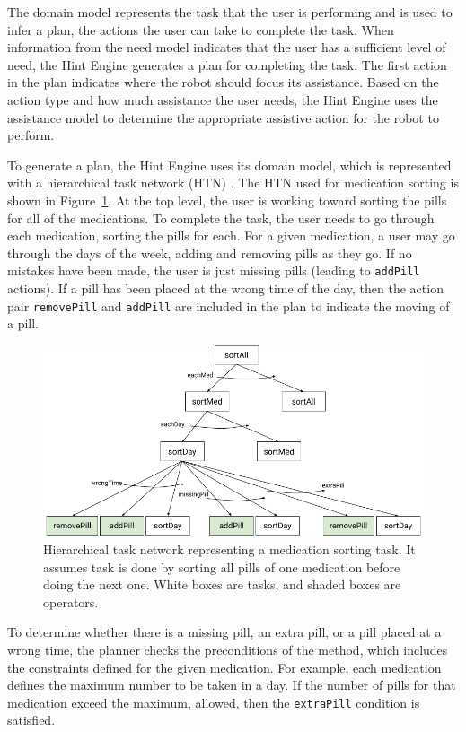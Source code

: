 \documentclass[letterpaper]{article} %
\begin{document}
The domain model represents the task that the user is performing and is used to infer a plan, the actions the user can take to complete the task.  When information from the need model indicates that the user has a sufficient level of need, the Hint Engine generates a plan for completing the task.  The first action in the plan indicates where the robot should focus its assistance.  Based on the action type and how much assistance the user needs, the Hint Engine uses the assistance model to determine the appropriate assistive action for the robot to perform.

To generate a plan, the Hint Engine uses its domain model, which is represented with a hierarchical task network (HTN) \cite{nau1999shop}.  The HTN used for medication sorting is shown in Figure~\ref{fig:htn}.  At the top level, the user is working toward sorting the pills for all of the medications.  To complete the task, the user needs to go through each medication, sorting the pills for each. For a given medication, a user may go through the days of the week, adding and removing pills as they go.  If no mistakes have been made, the user is just missing pills (leading to \texttt{addPill} actions).  If a pill has been placed at the wrong time of the day, then the action pair \texttt{removePill} and \texttt{addPill} are included in the plan to indicate the moving of a pill.

\begin{figure}[h]
\centering
\includegraphics[width=0.99\columnwidth]{medsorting_htn.png}
\caption{Hierarchical task network representing a medication sorting task. It assumes task is done by sorting all pills of one medication before doing the next one. White boxes are tasks, and shaded boxes are operators.  }
\label{fig:htn}
\end{figure}

To determine whether there is a missing pill, an extra pill, or a pill placed at a wrong time, the planner %
checks the preconditions of the method, which includes the constraints defined for the given medication.  For example, each medication defines the maximum number to be taken in a day.  If the number of pills for that medication exceed the maximum, allowed, then the \texttt{extraPill} condition is satisfied.
\end{document}
